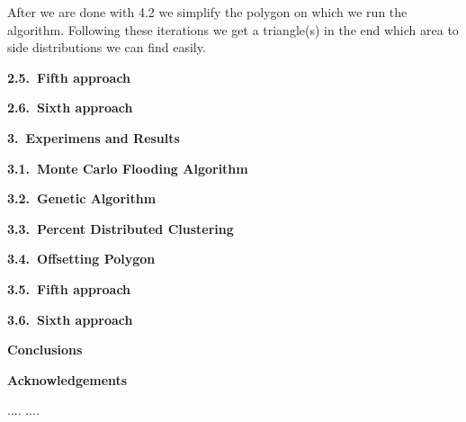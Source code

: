 \documentclass[11pt,leqno]{book}
\def\bibname{{\Large\bf References}}
\newcommand{\sect}[1]{\vskip7mm\par{\large \bf #1}}
\newcommand{\subsect}[1]{\vskip 3mm\par{\bf#1}}
\begin{document}
After we are done with 4.2 we simplify the polygon on which we run the algorithm. Following these iterations we get a triangle(s) in the end which area to side distributions we can find easily.

\subsect{2.5.~Fifth approach}

\subsect{2.6.~Sixth approach}

\sect{3.~Experimens and Results}

\subsect{3.1.~Monte Carlo Flooding Algorithm}

\subsect{3.2.~Genetic Algorithm}

\subsect{3.3.~Percent Distributed Clustering}

\subsect{3.4.~Offsetting Polygon}

\subsect{3.5.~Fifth approach}

\subsect{3.6.~Sixth approach}

\sect{Conclusions}

\sect{Acknowledgements}

\def\bibname{{\Large\bf References}}
\begin{thebibliography}{99}
%
 ....
%
 ....
%
\end{thebibliography}
%
\end{document}
